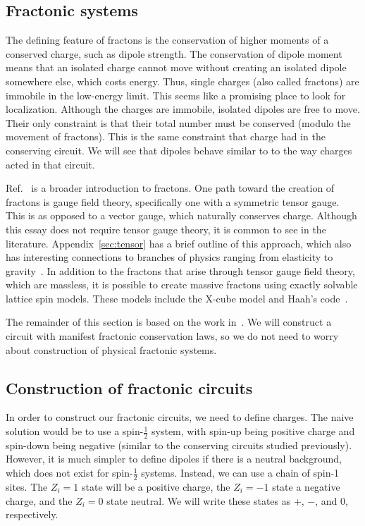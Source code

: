 \documentclass[a4paper,11pt]{article}
\renewcommand{\th}[1]{\frac{1}{#1}}
\begin{document}
\subsection{Fractonic systems} \label{sub:frac}

The defining feature of fractons is the conservation of higher moments of a conserved charge, such as dipole strength. The conservation of dipole moment means that an isolated charge cannot move without creating an isolated dipole somewhere else, which costs energy. Thus, single charges (also called fractons) are immobile in the low-energy limit. This seems like a promising place to look for localization.
Although the charges are immobile, isolated dipoles are free to move. Their only constraint is that their total number must be conserved (modulo the movement of fractons). This is the same constraint that charge had in the conserving circuit. We will see that dipoles behave similar to to the way charges acted in that circuit.

Ref.~\cite{NandkishoreFractons} is a broader introduction to fractons. One path toward the creation of fractons is gauge field theory, specifically one with a symmetric tensor gauge. This is as opposed to a vector gauge, which naturally conserves charge. Although this essay does not require tensor gauge theory, it is common to see in the literature. Appendix~\ref{sec:tensor} has a brief outline of this approach, which also has interesting connections to branches of physics ranging from elasticity to gravity~\cite{PretkoElasticity, PretkoGravity}.
In addition to the fractons that arise through tensor gauge field theory, which are massless, it is possible to create massive fractons using exactly solvable lattice spin models. These models include the X-cube model and Haah's code~\cite{CastelnovoGlass, HaahCode}.

The remainder of this section is based on the work in~\cite{PaiFracton}. We will construct a circuit with manifest fractonic conservation laws, so we do not need to worry about construction of physical fractonic systems.

\subsection{Construction of fractonic circuits} \label{sub:construct}

In order to construct our fractonic circuits, we need to define charges. The naive solution would be to use a spin-$\th{2}$ system, with spin-up being positive charge and spin-down being negative (similar to the conserving circuits studied previously). However, it is much simpler to define dipoles if there is a neutral background, which does not exist for spin-$\th{2}$ systems. Instead, we can use a chain of spin-1 sites. The $Z_i=1$ state will be a positive charge, the $Z_i=-1$ state a negative charge, and the $Z_i=0$ state neutral. We will write these states as +, $-$, and 0, respectively.
\end{document}
